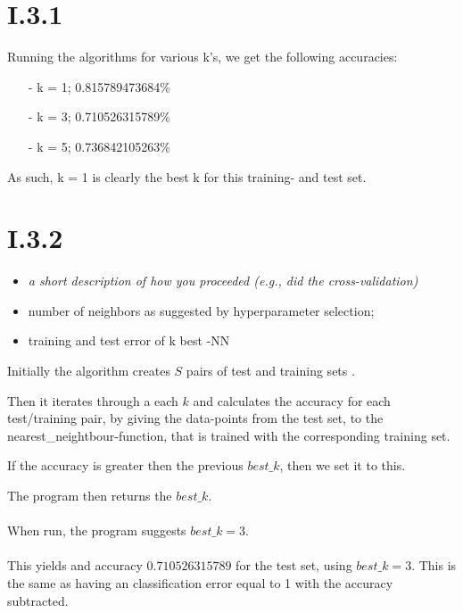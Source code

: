 \documentclass[12pt, a4paper]{article}
\begin{document}
\section{I.3.1}

Running the algorithms for various k's, we get the following accuracies:

\begin{itemize}
\item[-] k = 1; 0.815789473684\%
\item[-] k = 3; 0.710526315789\% 
\item[-] k = 5; 0.736842105263\%
\end{itemize}

As such, k = 1 is clearly the best k for this training- and test set.

\section{I.3.2}
\begin{itemize}
\item \textit{a short description of how you proceeded (e.g., did the
cross-validation)}
\item number of neighbors as suggested by hyperparameter selection;
\item training and test error of k best -NN
\end{itemize}

Initially the algorithm creates $S$ pairs of test and training sets .

Then it iterates through a each $k$ and calculates the accuracy for each test/training pair, by giving the data-points from the test set, to the nearest\_neightbour-function, that is trained with the corresponding training set.

If the accuracy is greater then the previous $best\_k$, then we set it to this.

The program then returns the $best\_k$.\\\\
When run, the program suggests $best\_k = 3$.\\\\
This yields and accuracy $0.710526315789$ for the test set, using $best\_k = 3$. This is the same as having an classification error equal to 1 with the accuracy subtracted.
\end{document}
